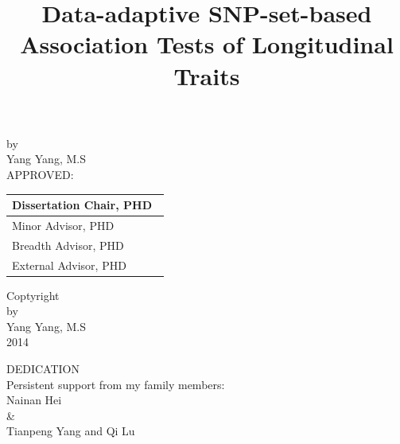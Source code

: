 \documentclass[12pt]{article}
\begin{document}
%
\begin{titlepage}
\title{\normalsize Data-adaptive SNP-set-based Association Tests of Longitudinal Traits}
\date{}
\maketitle

{\normalsize
\begin{center}
by\\[5mm]
Yang Yang, M.S\\[10mm]
APPROVED:\\[10mm]
\end{center}}

\begin{table}[h]
\begin{flushright}
\begin{tabular}{ p{8cm}}

\hline
Dissertation Chair, PHD\ \\[0.8cm]
\hline
Minor Advisor, PHD\\[0.8cm]
\hline
Breadth Advisor, PHD\\[0.8cm]
\hline
External Advisor, PHD\\[0.8cm]


\end{tabular}
\end{flushright}
\label{default}
\end{table}

\thispagestyle{empty}
\pagestyle{empty}
\end{titlepage}

\newpage
\thispagestyle{empty}
\begin{center}
Coptyright\\
by\\
Yang Yang, M.S\\
2014
\end{center}


\newpage
\thispagestyle{empty}
\doublespacing
\begin{center}
DEDICATION\\
Persistent support from my family members:\\
Nainan Hei\\
\&\\
Tianpeng Yang and Qi Lu
\end{center}
\end{document}
